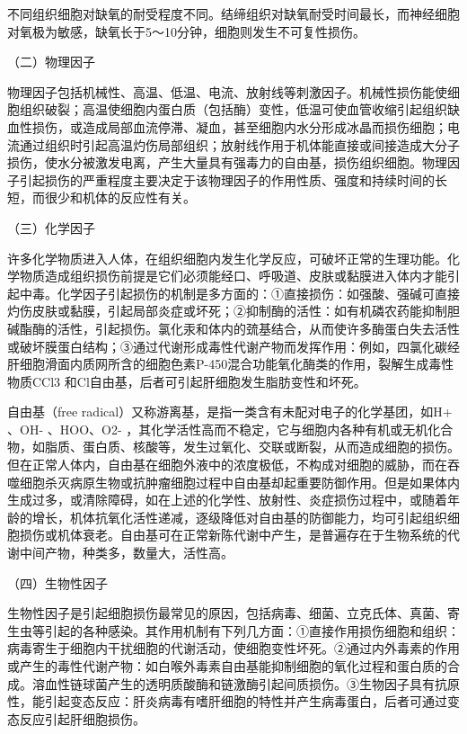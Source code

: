 不同组织细胞对缺氧的耐受程度不同。结缔组织对缺氧耐受时间最长，而神经细胞对氧极为敏感，缺氧长于5～10分钟，细胞则发生不可复性损伤。

{（二）物理因子}

物理因子包括机械性、高温、低温、电流、放射线等刺激因子。机械性损伤能使细胞组织破裂；高温使细胞内蛋白质（包括酶）变性，低温可使血管收缩引起组织缺血性损伤，或造成局部血流停滞、凝血，甚至细胞内水分形成冰晶而损伤细胞；电流通过组织时引起高温灼伤局部组织；放射线作用于机体能直接或间接造成大分子损伤，使水分被激发电离，产生大量具有强毒力的自由基，损伤组织细胞。物理因子引起损伤的严重程度主要决定于该物理因子的作用性质、强度和持续时间的长短，而很少和机体的反应性有关。

{（三）化学因子}

许多化学物质进入人体，在组织细胞内发生化学反应，可破坏正常的生理功能。化学物质造成组织损伤前提是它们必须能经口、呼吸道、皮肤或黏膜进入体内才能引起中毒。化学因子引起损伤的机制是多方面的：①直接损伤：如强酸、强碱可直接灼伤皮肤或黏膜，引起局部炎症或坏死；②抑制酶的活性：如有机磷农药能抑制胆碱酯酶的活性，引起损伤。氯化汞和体内的巯基结合，从而使许多酶蛋白失去活性或破坏膜蛋白结构；③通过代谢形成毒性代谢产物而发挥作用：例如，四氯化碳经肝细胞滑面内质网所含的细胞色素P-450混合功能氧化酶类的作用，裂解生成毒性物质CCl{3}
和Cl自由基，后者可引起肝细胞发生脂肪变性和坏死。

自由基（free
radical）又称游离基，是指一类含有未配对电子的化学基团，如H{+} 、OH{-}
、HOO、O{2-}
，其化学活性高而不稳定，它与细胞内各种有机或无机化合物，如脂质、蛋白质、核酸等，发生过氧化、交联或断裂，从而造成细胞的损伤。但在正常人体内，自由基在细胞外液中的浓度极低，不构成对细胞的威胁，而在吞噬细胞杀灭病原生物或抗肿瘤细胞过程中自由基却起重要防御作用。但是如果体内生成过多，或清除障碍，如在上述的化学性、放射性、炎症损伤过程中，或随着年龄的增长，机体抗氧化活性递减，逐级降低对自由基的防御能力，均可引起组织细胞损伤或机体衰老。自由基可在正常新陈代谢中产生，是普遍存在于生物系统的代谢中间产物，种类多，数量大，活性高。

{（四）生物性因子}

生物性因子是引起细胞损伤最常见的原因，包括病毒、细菌、立克氏体、真菌、寄生虫等引起的各种感染。其作用机制有下列几方面：①直接作用损伤细胞和组织：病毒寄生于细胞内干扰细胞的代谢活动，使细胞变性坏死。②通过内外毒素的作用或产生的毒性代谢产物：如白喉外毒素自由基能抑制细胞的氧化过程和蛋白质的合成。溶血性链球菌产生的透明质酸酶和链激酶引起间质损伤。③生物因子具有抗原性，能引起变态反应：肝炎病毒有嗜肝细胞的特性并产生病毒蛋白，后者可通过变态反应引起肝细胞损伤。

